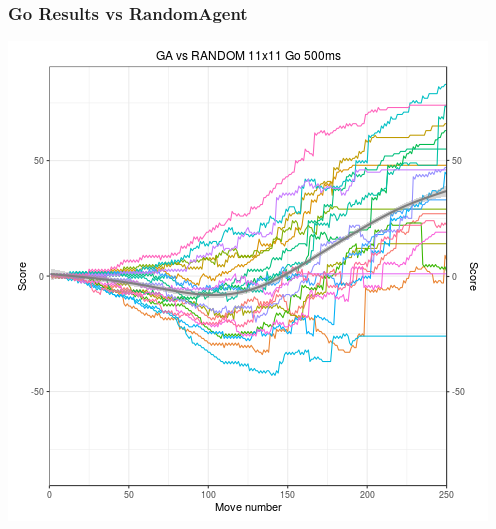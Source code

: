 \documentclass{beamer}
\begin{document}
\begin{frame}
\frametitle{Go Results vs RandomAgent}
\centering
\includegraphics[scale=0.35]{images/garand500go11.png}
\end{frame}
\end{document}
